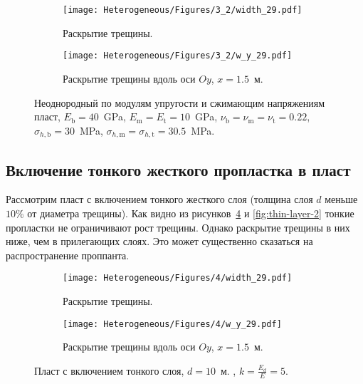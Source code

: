 \begin{figure}[htbp]
    \centering
    \begin{subfigure}[t]{0.4\textwidth}
        \centering
        \caption{Раскрытие трещины.}
        \label{fig:comparison-2-planar}
        \texttt{[image: Heterogeneous/Figures/3\_2/width\_29.pdf]}
    \end{subfigure}
    \hfill 
    \begin{subfigure}[t]{0.55\textwidth}
        \centering
        \caption{Раскрытие трещины вдоль оси $Oy$, $x=1.5$~м.}
        \label{fig:comparison-2-slice}
        \texttt{[image: Heterogeneous/Figures/3\_2/w\_y\_29.pdf]}
    \end{subfigure}
    \caption{Неоднородный по модулям упругости и сжимающим напряжениям пласт, $E_\text{b} = 40$~GPa, $E_\text{m} = E_\text{t} = 10$~GPa, $\nu_\text{b} = \nu_\text{m} = \nu_\text{t} = 0.22$, $\sigma_{h,\text{b}} = 30$~MPa, $\sigma_{h,\text{m}} = \sigma_{h,\text{t}} = 30.5$~MPa.}
    \label{fig:comparison-2}
\end{figure}


\subsection{Включение тонкого жесткого пропластка в пласт}
Рассмотрим пласт с включением тонкого жесткого слоя (толщина слоя $d$ меньше $10\%$ от диаметра трещины). Как видно из рисунков~\ref{fig:thin-layer-1} и \ref{fig:thin-layer-2} тонкие пропластки не ограничивают рост трещины. Однако раскрытие трещины в них ниже, чем в прилегающих слоях. Это может существенно сказаться на распространение проппанта. 
\begin{figure}[htbp]
    \centering
    \begin{subfigure}[t]{0.4\textwidth}
        \centering
        \caption{Раскрытие трещины.}
        \texttt{[image: Heterogeneous/Figures/4/width\_29.pdf]}
    \end{subfigure}
    \hfill 
    \begin{subfigure}[t]{0.55\textwidth}
        \centering
        \caption{Раскрытие трещины вдоль оси $Oy$, $x=1.5$~м.}
        \texttt{[image: Heterogeneous/Figures/4/w\_y\_29.pdf]}
    \end{subfigure}
    \caption{Пласт с включением тонкого слоя, $d=10$~м. , $k=\frac{E_d}{E}=5$.}
    \label{fig:thin-layer-1}
\end{figure}

